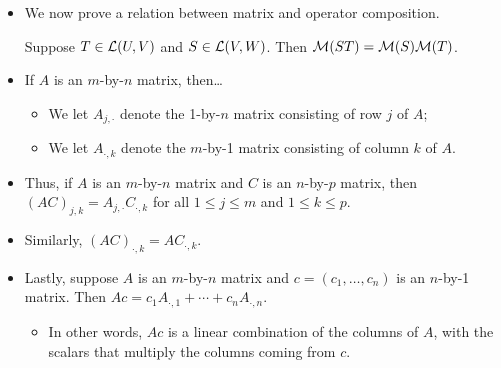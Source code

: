 \documentclass[../main.tex]{subfiles}
\begin{document}
\begin{itemize}
    \item We now prove a relation between matrix and operator composition.
    \begin{theorem}\label{trm:matSTmatSmatT}
        Suppose $T\in\mathcal{L}(U,V)$ and $S\in\mathcal{L}(V,W)$. Then $\mathcal{M}(ST)=\mathcal{M}(S)\mathcal{M}(T)$.
    \end{theorem}
    \item If $A$ is an $m$-by-$n$ matrix, then\dots
    \begin{itemize}
        \item We let $A_{j,\cdot}$ denote the 1-by-$n$ matrix consisting of row $j$ of $A$;
        \item We let $A_{\cdot,k}$ denote the $m$-by-1 matrix consisting of column $k$ of $A$.
    \end{itemize}
    \item Thus, if $A$ is an $m$-by-$n$ matrix and $C$ is an $n$-by-$p$ matrix, then $(AC)_{j,k}=A_{j,\cdot}C_{\cdot,k}$ for all $1\leq j\leq m$ and $1\leq k\leq p$.
    \item Similarly, $(AC)_{\cdot,k}=AC_{\cdot,k}$.
    \item Lastly, suppose $A$ is an $m$-by-$n$ matrix and $c=(c_1,\dots,c_n)$ is an $n$-by-1 matrix. Then $Ac=c_1A_{\cdot,1}+\cdots+c_nA_{\cdot,n}$.
    \begin{itemize}
        \item In other words, $Ac$ is a linear combination of the columns of $A$, with the scalars that multiply the columns coming from $c$.
    \end{itemize}
\end{itemize}
\end{document}
